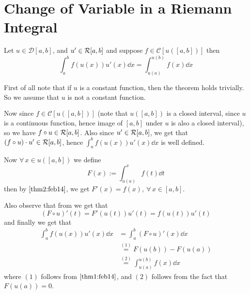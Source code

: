 \section{Change of Variable in a Riemann Integral}

\begin{thm}\label{thm4:feb14}
    Let $u \in \mathcal{D}[a,b]$, and $u' \in \mathcal{R}[a,b]$ and suppose $f \in \mathcal{C}[u([a,b])]$ then 
    \begin{equation}\label{change_of_var}
        \int_a^b f\left(u(x)\right) u'(x) \dd{x} = \int_{u(a)}^{u(b)} f(x) \dd{x}    
    \end{equation}
\end{thm}

\begin{prf}
    First of all note that if $u$ is a constant function, then the theorem holds trivially. So we assume that $u$ is not a constant function. 

    Now since $f \in \mathcal{C}[u([a,b])]$ (note that $u([a,b])$ is a closed interval, since $u$ is a continuous function, hence image of $[a,b]$ under $u$ is also a closed interval), so we have $f \circ u \in \mathcal{R}[a,b]$. Also since $u' \in \mathcal{R}[a,b]$, we get that $(f \circ u) \cdot u' \in \mathcal{R}[a,b]$, hence $\int_a^b f (u(x))u'(x) \dd{x}$ is well defined.

    Now $\forall \, x \in u([a,b])$ we define 
    \[
        F(x) := \int_{u(a)}^x f(t) \dd{t}  
    \] 
    then by  $\ref{thm2:feb14}$, we get $F'(x) = f(x), \ \forall \, x \in [a,b]$.

    Also observe that from  we get that 
    \[
        \left( F \circ u \right)'(t) = F'(u(t))u'(t) = f(u(t))u'(t)  
    \]
    and finally we get that 
    \begin{align*}
        \int_a^b f(u(x))u'(x) \dd{x} &= \int_a^b \left( F \circ u \right)'(x) \dd{x} \\ 
        &\overset{(1)}{=} F(u(b)) - F(u(a)) \\ 
        &\overset{(2)}{=} \int_{u(a)}^{u(b)} f(x) \dd{x}
    \end{align*}
    where $(1)$ follows from  $\ref{thm1:feb14}$, and $(2)$ follows from the fact that $F(u(a)) = 0$.
\end{prf}
